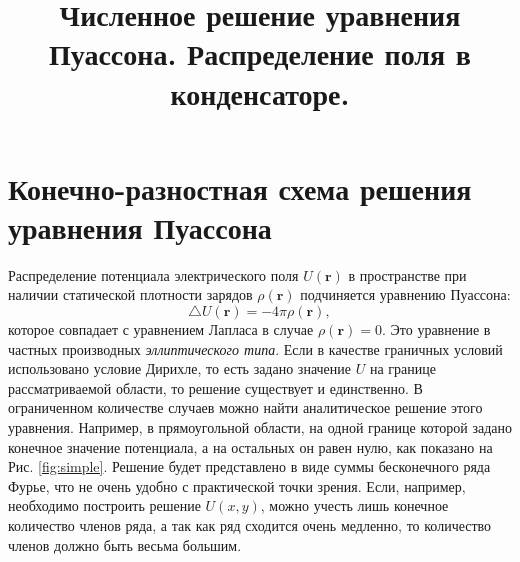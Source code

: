 \documentclass[12pt]{article}
\title{Численное решение уравнения Пуассона. Распределение поля в конденсаторе.}
\author{}
\date{}
\renewcommand{\vec}[1]{\textbf{#1}}
\begin{document}
\maketitle

\section*{Конечно-разностная схема решения уравнения Пуассона}
Распределение потенциала электрического поля $U(\vec{r})$ в пространстве при наличии статической плотности зарядов $\rho(\vec{r})$ подчиняется уравнению Пуассона:
%
\begin{equation}
\triangle U(\vec{r})=-4\pi\rho(\vec{r}),
\end{equation}
%
которое совпадает с уравнением Лапласа в случае $\rho(\vec{r})=0$. Это уравнение в частных производных \textit{эллиптического типа}. Если в качестве граничных условий использовано условие Дирихле, то есть задано значение $U$ на границе рассматриваемой области, то решение существует и единственно. В ограниченном количестве случаев можно найти аналитическое решение этого уравнения. Например, в прямоугольной области, на одной границе которой задано конечное значение потенциала, а на остальных он равен нулю, как показано на Рис. \ref{fig:simple}. Решение будет представлено в виде суммы бесконечного ряда Фурье, что не очень удобно с практической точки зрения. Если, например, необходимо построить решение $U(x,y)$, можно учесть лишь конечное количество членов ряда, а так как ряд сходится очень медленно, то количество членов должно быть весьма большим.
\end{document}
